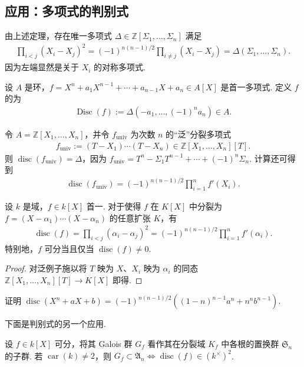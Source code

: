 \subsection{应用：多项式的判别式}\label{sec:galois-2-9-4}
由上述定理，存在唯一多项式 $\Delta\in\mathbb Z[\Sigma_1,\ldots,\Sigma_n]$ 满足
\begin{align*}
\prod_{i<j}(X_i-X_j)^2=(-1)^{n(n-1)/2}\prod_{i\ne j}(X_i-X_j)=\Delta(\Sigma_1,\ldots,\Sigma_n).
\end{align*}
因为左端显然是关于 $X_i$ 的对称多项式.
\begin{definition*}设 $A$ 是环，$f=X^n+a_1X^{n-1}+\cdots+a_{n-1}X+a_n\in A[X]$ 是首一多项式. 定义 $f$ 的为
\begin{align*}
\operatorname{Disc}(f):=\Delta(-a_1,\ldots,(-1)^na_n)\in A.
\end{align*}\end{definition*}
\begin{example*}令 $A=\mathbb Z[X_1,\ldots,X_n]$，并令 $f_{\mathrm{univ}}$ 为次数 $n$ 的``泛''分裂多项式
\begin{align*}
f_{\mathrm{univ}}:=(T-X_1)\cdots(T-X_n)\in\mathbb Z[X_1,\ldots,X_n][T].
\end{align*}
则 $\operatorname{disc}(f_{\mathrm{univ}})=\Delta$，因为 $f_{\mathrm{univ}}=T^n-\Sigma_1T^{n-1}+\cdots+(-1)^n\Sigma_n$. 计算还可得到
\begin{align*}
\operatorname{disc}(f_{\mathrm{univ}})=(-1)^{n(n-1)/2}\prod_{i=1}^nf'(X_i).
\end{align*}\end{example*}
\begin{proposition*}设 $k$ 是域，$f\in k[X]$ 首一. 对于使得 $f$ 在 $K[X]$ 中分裂为 $f=(X-\alpha_1)\cdots(X-\alpha_n)$ 的任意扩张 $K$，有
\begin{align*}
\operatorname{disc}(f)=\prod_{i<j}(\alpha_i-\alpha_j)^2=(-1)^{n(n-1)/2}\prod_{i=1}^nf'(\alpha_i).
\end{align*}
特别地，$f$ 可分当且仅当 $\operatorname{disc}(f)\ne0$.\end{proposition*}
\begin{proof}对泛例子施以将 $T$ 映为 $X$、$X_i$ 映为 $\alpha_i$ 的同态 $\mathbb Z[X_1,\ldots,X_n][T]\to K[X]$ 即得.\end{proof}
\begin{exercise*}证明 $\operatorname{disc}(X^n+aX+b)=(-1)^{n(n-1)/2}((1-n)^{n-1}a^n+n^nb^{n-1})$.\end{exercise*}
下面是判别式的另一个应用.
\begin{proposition*}设 $f\in k[X]$ 可分，将其 Galois 群 $G_f$ 看作其在分裂域 $K_f$ 中各根的置换群 $\mathfrak S_n$ 的子群. 若 $\operatorname{car}(k)\ne2$，则 $G_f\subset\mathfrak A_n\Longleftrightarrow\operatorname{disc}(f)\in(k^\times)^2$.\end{proposition*}
